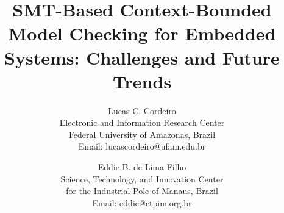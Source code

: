 \documentclass{acm_sen_article}
\begin{document}
%
\title{SMT-Based Context-Bounded Model Checking for Embedded Systems: Challenges and Future Trends}


\author{Lucas C. Cordeiro \\
Electronic and Information Research Center\\
Federal University of Amazonas, Brazil\\
Email: lucascordeiro@ufam.edu.br
\and
Eddie B. de Lima Filho \\
Science, Technology, and Innovation Center\\ for the Industrial Pole of Manaus, Brazil \\
Email: eddie@ctpim.org.br}


% 
\end{document}

